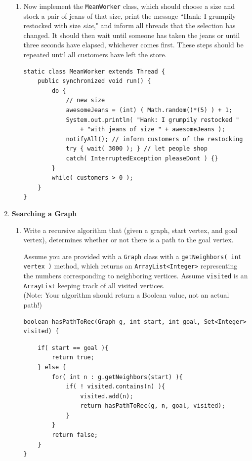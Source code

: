 \documentclass[11pt]{article}
\newenvironment{answer}{\large\lstset{basicstyle=\tiny\ttfamily}\color{white}}{}
\newenvironment{answer}{\large\lstset{basicstyle=\large\ttfamily}\color{red}}{}
\begin{document}
\begin{enumerate}
\begin{enumerate}
    \item Now implement the \texttt{MeanWorker} class, which should choose a size and
          stock a pair of jeans of that size, print the message ``Hank: I
          grumpily restocked with size \emph{size}," and inform all threads
          that the selection has changed. It should then wait until someone has
          taken the jeans or until three seconds have elapsed, whichever comes
          first. These steps should be repeated until all customers have left
          the store.

\begin{answer}
\begin{lstlisting}
static class MeanWorker extends Thread {
    public synchronized void run() {
        do {
			// new size
            awesomeJeans = (int) ( Math.random()*(5) ) + 1;
            System.out.println( "Hank: I grumpily restocked "
                + "with jeans of size " + awesomeJeans );
            notifyAll(); // inform customers of the restocking
            try { wait( 3000 ); } // let people shop
            catch( InterruptedException pleaseDont ) {}
        }
        while( customers > 0 );
    }
}
\end{lstlisting}
\end{answer}
    \end{enumerate}
    
\newpage
\item \textbf{Searching a Graph}
	\begin{enumerate}
		\item
			Write a recursive algorithm that (given a graph, start vertex, and goal vertex),
			determines whether or not there is a path to the goal vertex.

            Assume you are provided with a \texttt{Graph} class with a \texttt{getNeighbors( int vertex )} method, which returns an \texttt{ArrayList\textless Integer\textgreater} representing the numbers corresponding to neighboring vertices. Assume \texttt{visited} is an \texttt{ArrayList} keeping track of all visited vertices. \\
			(Note: Your algorithm should return a Boolean value, not an actual path!)
\begin{verbatim}
boolean hasPathToRec(Graph g, int start, int goal, Set<Integer> visited) {
\end{verbatim}
			
\begin{answer}
\begin{lstlisting}
	if( start == goal ){
		return true;
	} else {
		for( int n : g.getNeighbors(start) ){
			if( ! visited.contains(n) ){
				visited.add(n);
				return hasPathToRec(g, n, goal, visited);
			}
		}
		return false;
	}
}
\end{lstlisting}
\end{answer}
		            

\end{enumerate}
\end{enumerate}
\end{document}
